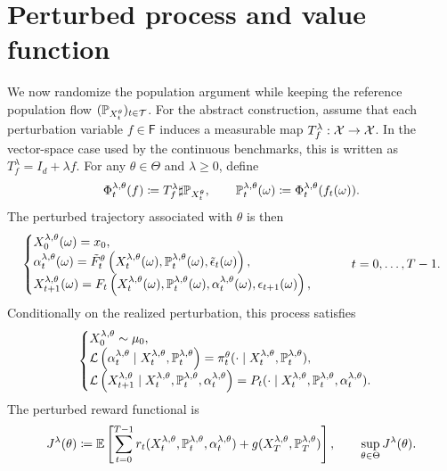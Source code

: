 \section{Perturbed process and value function}

We now randomize the population argument while keeping the reference population flow $(\P_{X_t^\theta})_{t\in\Tc}$. For the abstract construction, assume that each perturbation variable $f\in\mathsf F$ induces a measurable map $T_f^\lambda:\Xc\to\Xc$. In the vector-space case used by the continuous benchmarks, this is written as $T_f^\lambda=I_d+\lambda f$. For any $\theta\in\Theta$ and $\lambda\geq0$, define
\begin{align}
    \Phi_t^{\lambda,\theta}(f)
    \coloneqq
    T_f^\lambda\sharp\P_{X_t^\theta},
    \qquad
    \P_t^{\lambda,\theta}(\omega)
    \coloneqq
    \Phi_t^{\lambda,\theta}(f_t(\omega)).
\end{align}
The perturbed trajectory associated with $\theta$ is then
\begin{align}
    \begin{cases}
        X_0^{\lambda,\theta}(\omega)=x_0,\\
        \alpha_t^{\lambda,\theta}(\omega)
        =
        \tilde F_t^\theta
        \left(X_t^{\lambda,\theta}(\omega),\P_t^{\lambda,\theta}(\omega),\tilde\epsilon_t(\omega)\right),\\
        X_{t+1}^{\lambda,\theta}(\omega)
        =
        F_t
        \left(X_t^{\lambda,\theta}(\omega),\P_t^{\lambda,\theta}(\omega),\alpha_t^{\lambda,\theta}(\omega),\epsilon_{t+1}(\omega)\right),
    \end{cases}
    \qquad t=0,\ldots,T-1.
\end{align}
Conditionally on the realized perturbation, this process satisfies
\begin{align}
    \label{eq:methodology-perturbed_equations}
    \begin{cases}
        X_0^{\lambda,\theta}\sim\mu_0,\\
        \Lc\left(\alpha_t^{\lambda,\theta}
        \mid X_t^{\lambda,\theta},\P_t^{\lambda,\theta}\right)
        =
        \pi_t^\theta(\cdot\mid X_t^{\lambda,\theta},\P_t^{\lambda,\theta}),\\
        \Lc\left(X_{t+1}^{\lambda,\theta}
        \mid X_t^{\lambda,\theta},\P_t^{\lambda,\theta},\alpha_t^{\lambda,\theta}\right)
        =
        P_t(\cdot\mid X_t^{\lambda,\theta},\P_t^{\lambda,\theta},\alpha_t^{\lambda,\theta}).
    \end{cases}
\end{align}
The perturbed reward functional is
\begin{align}
    J^\lambda(\theta)
    \coloneqq
    \E\left[
        \sum_{t=0}^{T-1}
        r_t(X_t^{\lambda,\theta},\P_t^{\lambda,\theta},\alpha_t^{\lambda,\theta})
        +
        g(X_T^{\lambda,\theta},\P_T^{\lambda,\theta})
    \right],
    \qquad
    \sup_{\theta\in\Theta}J^\lambda(\theta).
\end{align}

